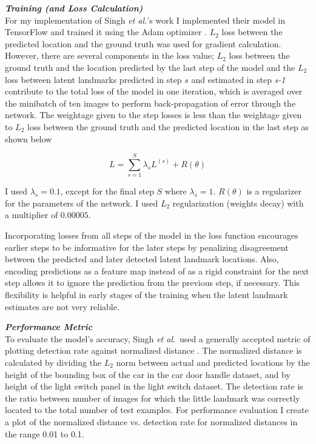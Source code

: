 \documentclass [11pt,letterpaper ,openany ]{report}
\begin{document}
    \noindent
    \textbf{\textit{Training (and Loss Calculation)}}\\
    For my implementation of Singh \textit{et al.}'s work I implemented their model in TensorFlow and trained it using the Adam optimizer \cite{kingma2014adam}. \(L_2\) loss between the predicted location and the ground truth was used for gradient calculation. However, there are several components in the loss value; \(L_2\) loss between the ground truth and the location predicted by the last step of the model and the \(L_2\) loss between latent landmarks predicted in step \(s\) and estimated in step \textit {s-1} contribute to the total loss of the model in one iteration, which is averaged over the minibatch of ten images to perform back-propagation of error through the network. The weightage given to the step losses is less than the weightage given to \(L_2\) loss between the ground truth and the predicted location in the last step as shown below

    \[ L =  \displaystyle\sum_{s=1}^{S} \lambda _s L^{(s)} + R(\theta)\]

    \noindent
    I used \( \lambda _s = 0.1 \), except for the final step \(S\) where \( \lambda _s = 1\).  \( R(\theta) \) is a regularizer for the parameters of the network. I used \(L_2\) regularization (weights decay) with a multiplier of \(0.00005\). 
        
    Incorporating losses from all steps of the model in the loss function encourages earlier steps to be informative for the later steps by penalizing disagreement between the predicted and later detected latent landmark locations. Also, encoding predictions as a feature map instead of as a rigid constraint for the next step allows it to ignore the prediction from the previous step, if necessary. This flexibility is helpful in early stages of the training when the latent landmark estimates are not very reliable.

    \noindent
    \textbf{\textit{Performance Metric}}\\
    To evaluate the model's accuracy, Singh \textit{et al}.\ used a generally accepted metric of plotting detection rate against normalized distance  \cite{godil2014performance}. The normalized distance is calculated by dividing the \(L_2\) norm between actual and predicted locations by the height of the bounding box of the car in the car door handle dataset,  and by height of the light switch panel in the light switch dataset. The detection rate is the ratio between number of images for which the little landmark was correctly located to the total number of test examples. For performance evaluation I create a plot of the normalized distance vs. detection rate for normalized distances in the range 0.01 to 0.1.
\end{document}
